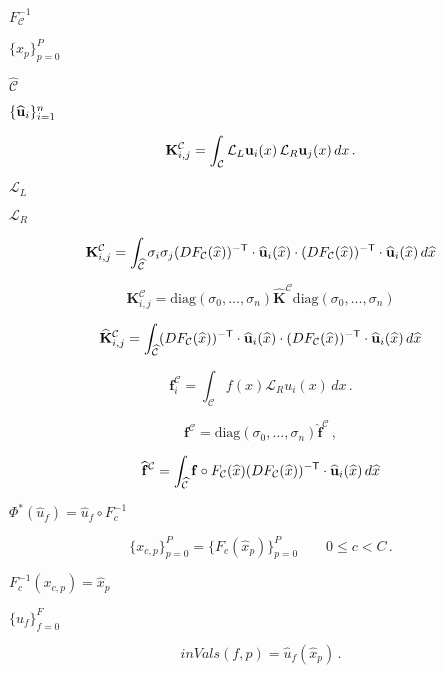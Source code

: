 \documentclass{article}
\begin{document}
$F^{-1}_{\mathcal C}$
\pagebreak

$\{\widehat{x}_p\}_{p=0}^P$
\pagebreak

$\widehat{\mathcal{C}}$
\pagebreak

$\{\widehat{\bf u}_i\}_{i=1}^n$
\pagebreak

\[
      \mathbf{K}^{\mathcal{C}}_{i,j} = \int_{\mathcal C} {\mathcal L}_L {\bf u}_i(x)\, {\mathcal L}_R {\bf u}_j(x) \, dx \,.
 \]
\pagebreak

${\mathcal L}_L$
\pagebreak

${\mathcal L}_R $
\pagebreak

\[
     \mathbf{K}^{\mathcal{C}}_{i,j} = \int_{\widehat{\mathcal C}} \sigma_i \sigma_j
     (DF_{\mathcal C}(\widehat{x}))^{-{\sf T}}\cdot\widehat{\bf u}_i(\widehat{x})\cdot
     (DF_{\mathcal C}(\widehat{x}))^{-{\sf T}}\cdot\widehat{\bf u}_i(\widehat{x})\,d\widehat{x}
 \]
\pagebreak

\[
   \mathbf{K}^{\mathcal{C}}_{i,j} = 
   \mbox{diag}(\sigma_0,\ldots,\sigma_n)\widehat{\mathbf{K}}^{\mathcal{C}}\mbox{diag}(\sigma_0,\ldots,\sigma_n)
 \]
\pagebreak

\[ 
   \widehat{\mathbf{K}}^{\mathcal{C}}_{i,j} = \int_{\widehat{\mathcal C}}
   (DF_{\mathcal C}(\widehat{x}))^{-{\sf T}}\cdot\widehat{\bf u}_i(\widehat{x})\cdot
   (DF_{\mathcal C}(\widehat{x}))^{-{\sf T}}\cdot\widehat{\bf u}_i(\widehat{x})\,d\widehat{x}
 \]
\pagebreak

\[
   \mathbf{f}^{\mathcal{C}}_{i} = \int_{\mathcal C} f(x) {\mathcal L}_R u_i(x) \, dx \,.
 \]
\pagebreak

\[
   \mathbf{f}^{\mathcal{C}} = 
      \mbox{diag}(\sigma_0,\ldots,\sigma_n)\widehat{\mathbf{f}}^{\mathcal{C}}\,,
 \]
\pagebreak

\[
   \widehat{\mathbf{f}}^{\mathcal{C}} = \int_{\widehat{\mathcal C}}
         \mathbf{f}\circ F_{\mathcal C}(\widehat{x}) 
         (DF_{\mathcal C}(\widehat{x}))^{-{\sf T}}\cdot\widehat{\bf u}_i(\widehat{x})\,d\widehat{x}
 \]
\pagebreak

$\Phi^*(\widehat{u}_f) = \widehat{u}_f\circ F^{-1}_{c} $
\pagebreak

\[
         \{ x_{c,p} \}_{p=0}^P = \{ F_{c} (\widehat{x}_p) \}_{p=0}^{P}\qquad 0\le c < C \,.
  \]
\pagebreak

$ F^{-1}_{c}(x_{c,p}) = \widehat{x}_p $
\pagebreak

$\{\widehat{u}_f\}_{f=0}^{F}$
\pagebreak

\[
         inVals(f,p) = \widehat{u}_f(\widehat{x}_p) \,.
  \]
\pagebreak
\end{document}
